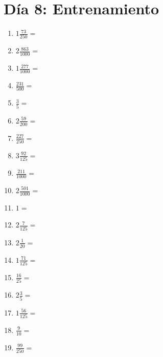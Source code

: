 \documentclass[12pt]{article}
\begin{document}
\section*{Día 8: Entrenamiento}
\begin{enumerate}
\item \large $ 1 \frac{73}{250} = $ \vspace{1.5cm}
\item \large $ 2 \frac{863}{1000} = $ \vspace{1.5cm}
\item \large $ 1 \frac{277}{1000} = $ \vspace{1.5cm}
\item \large $ \frac{231}{500} = $ \vspace{1.5cm}
\item \large $ \frac{3}{5} = $ \vspace{1.5cm}
\item \large $ 2 \frac{59}{200} = $ \vspace{1.5cm}
\item \large $ \frac{227}{250} = $ \vspace{1.5cm}
\item \large $ 3 \frac{92}{125} = $ \vspace{1.5cm}
\item \large $ \frac{211}{1000} = $ \vspace{1.5cm}
\item \large $ 2 \frac{501}{1000} = $ \vspace{1.5cm}
\newpage
\item \large $ 1 = $ \vspace{1.5cm}
\item \large $ 2 \frac{7}{125} = $ \vspace{1.5cm}
\item \large $ 2 \frac{1}{20} = $ \vspace{1.5cm}
\item \large $ 1 \frac{71}{125} = $ \vspace{1.5cm}
\item \large $ \frac{16}{25} = $ \vspace{1.5cm}
\item \large $ 2 \frac{3}{5} = $ \vspace{1.5cm}
\item \large $ 1 \frac{56}{125} = $ \vspace{1.5cm}
\item \large $ \frac{9}{10} = $ \vspace{1.5cm}
\item \large $ \frac{99}{250} = $ \vspace{1.5cm}

\end{enumerate}
\end{document}
